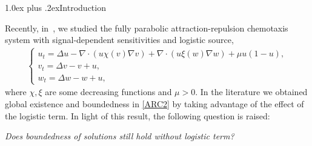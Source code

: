 \documentclass[12pt,reqno,draft]{article}
\makeatletter
\renewcommand{\section}{%
\@startsection{section}{1}{\z@}
{0.5truecm plus -1ex minus -.2ex}%
{1.0ex plus .2ex}{\bfseries\large}}
\numberwithin{equation}{section}
\theoremstyle{theorem}
\theoremstyle{definition}
\makeatother
\begin{document}
\section{Introduction} \label{Sec1}

Recently, in~\cite{CMY-2020}, we studied the fully parabolic 
attraction-repulsion chemotaxis system 
with signal-dependent sensitivities and logistic source,
% 
    \begin{align} \label{ARC2}
        \begin{cases}
        u_t=\Delta u-\nabla \cdot (u\chi(v)\nabla v)
                         +\nabla \cdot (u\xi(w)\nabla w)
                         +\mu u(1-u),
    \\[1.05mm]
        v_t=\Delta v-v+u,
    \\[1.05mm]
        w_t=\Delta w-w+u,
        \end{cases}
    \end{align}
where $\chi, \xi$ are some decreasing functions and $\mu>0$. 
In the literature we obtained global existence and boundedness 
in \eqref{ARC2} by taking advantage of the effect of the logistic term. 
In light of this result, 
the following question is raised:
\begin{center}
{\it Does boundedness of  solutions still hold 
without logistic term?}
\end{center}
\end{document}
